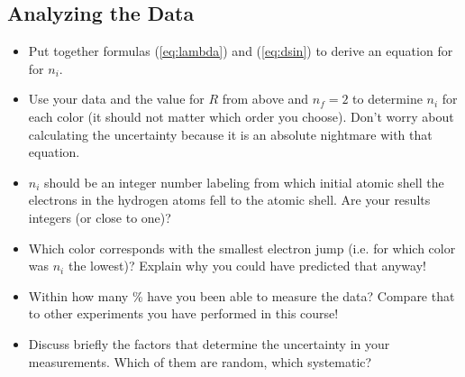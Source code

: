 \subsection{Analyzing the Data}
\begin{itemize}
\item Put together formulas ({\ref{eq:lambda}}) and ({\ref{eq:dsin}}) to derive an equation for for $n_i$.
\item Use your data and the value for $R$ from above and $n_f=2$ to determine $n_i$ for each color (it should not matter which order you choose). Don't worry about calculating the uncertainty because it is an absolute nightmare  with that equation.
\item $n_i$ should be an integer number labeling from which initial atomic shell the electrons in the hydrogen atoms fell to the  atomic shell. Are your results integers (or close to one)?
\item Which color corresponds with the smallest electron jump (i.e. for which color was $n_i$ the lowest)? Explain why you could have predicted that anyway!
\item Within how many \% have you been able to measure the data? Compare that to other experiments you have performed in this course!
\item Discuss briefly the factors that determine the uncertainty in your measurements. Which of them are random, which systematic?
\end{itemize}

\newpage
